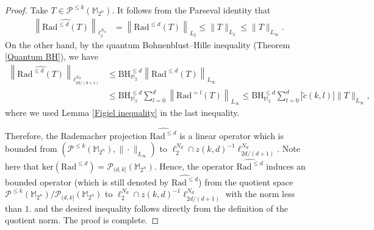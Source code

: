 \documentclass{amsbook}
\theoremstyle{definition}
\theoremstyle{remark}
\numberwithin{section}{chapter}
\numberwithin{equation}{chapter}
\newcommand{\M}{\mathbb{M}}
\newcommand{\1}{\mathbf{1}}
\begin{document}
\begin{proof}
Take $T\in \mathcal{P}^{\leq k}(\M_{2^n})$. It follows from the Parseval identity that 
\begin{align*}
\left\|\widehat{\mathrm{Rad}^{\leq d}(T)}\right\|_{\ell_{2}^{N_{d}}}&=\left\|\mathrm{Rad}^{\leq d}(T)\right\|_{L_{2}}
\leq \|T\|_{L_{2}}\leq \|T\|_{L_{\infty}}.
\end{align*}
On the other hand, by the quantum Bohnenblust--Hille inequality (Theorem \ref{Quantum BH}), we have
\begin{align*}
\left\|\widehat{\mathrm{Rad}^{\leq d}(T)}\right\|_{\ell^{N_{d}}_{2d/(d+1)}}&\leq \mathrm{BH}_{\mathbb{M}_2}^{\leq d} \left\|\mathrm{Rad}^{\leq d}(T)\right\|_{L_{\infty}}\\
&\leq \mathrm{BH}_{\mathbb{M}_2}^{\leq d} \sum_{l=0}^{d}\left\|\mathrm{Rad}^{=l}(T)\right\|_{L_{\infty}}\leq \mathrm{BH}_{\mathbb{M}_2}^{\leq d} \sum_{l=0}^{d}|\tilde{c}(k,l)|\|T\|_{L_{\infty}},
\end{align*}
where we used Lemma \ref{Figiel inequality} in the last inequality.

Therefore, the Rademacher projection $\widehat{\mathrm{Rad}^{\leq d}}$ is a linear operator which is bounded from $(\mathcal{P}^{\leq k}(\M_{2^n}),\|\cdot\|_{L_{\infty}})$ to $\ell^{N_{d}}_{2}\cap z(k,d)^{-1}\ell^{N_{d}}_{2d/(d+1)}$. Note here that $\mathrm{ker}(\mathrm{Rad}^{\leq d})=\mathcal{P}_{(d,k]}(\M_{2^n})$. Hence, the operator $\widehat{\mathrm{Rad}^{\leq d}}$ induces an bounded operator (which is still denoted by $\widehat{\mathrm{Rad}^{\leq d}}$) from the quotient space $\mathcal{P}^{\leq k}(\M_{2^n})/\mathcal{P}_{(d,k]}(\M_{2^n})$ to $\ell^{N_{d}}_{2}\cap z(k,d)^{-1}\ell^{N_{d}}_{2d/(d+1)}$ with the norm less than $1$.  and the desired
inequality follows directly from the definition of the quotient norm.  The proof is complete.
\end{proof}
\end{document}
